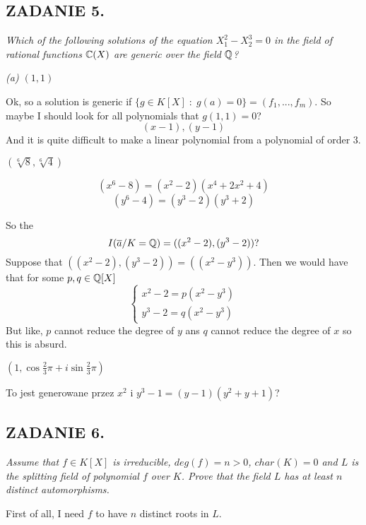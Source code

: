 \documentclass{article}
\begin{document}
\subsection*{ZADANIE 5.}
\emph{\color{pink}Which of the following solutions of the equation $X_1^2-X_2^3=0$ in the field of rational functions $\mathbb{C}(X)$ are generic over the field $\mathbb{Q}$?}

\emph{\color{pink}(a) $(1, 1)$}
\smallskip

Ok, so a solution is generic if $\{g\in K[X]\;:\;g(a)=0\}=(f_1,...,f_m)$. So maybe I should look for all polynomials that $g(1, 1)=0$?
$$(x-1),(y-1)$$
And it is quite difficult to make a linear polynomial from a polynomial of order $3$.

\emph{\color{pink} $(\sqrt[6]{8}, \sqrt[6]{4})$}
\smallskip

$$(x^6-8)=(x^2-2)(x^4+2x^2+4)$$
$$(y^6-4)=(y^3-2)(y^3+2)$$

So the 
$$I(\overline a/K=\mathbb{Q})=((x^2-2), (y^3-2))?$$ 
Suppose that $((x^2-2), (y^3-2))=((x^2-y^3))$. Then we would have that for some $p, q\in \mathbb{Q}[X]$
$$\begin{cases}
    x^2-2=p(x^2-y^3)\\
    y^3-2=q(x^2-y^3)
\end{cases}$$
But like, $p$ cannot reduce the degree of $y$ ans $q$ cannot reduce the degree of $x$ so this is absurd.

\emph{\color{pink} $(1, \cos\frac23\pi+i\sin\frac23\pi)$}

To jest generowane przez $x^2$ i $y^3-1=(y-1)(y^2+y+1)$?

\subsection*{ZADANIE 6.}
\emph{\color{pink}Assume that $f\in K[X]$ is irreducible, $deg(f)=n>0$, $char(K)=0$ and $L$ is the splitting field of polynomial $f$ over $K$. Prove that the field $L$ has at least $n$ distinct automorphisms.}
\smallskip

First of all, I need $f$ to have $n$ distinct roots in $L$. 



\end{document}
